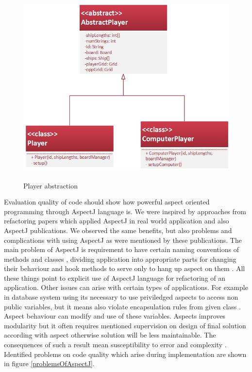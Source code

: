 \documentclass[11pt,english,a4paper,twoside]{article}
\begin{document}
\begin{figure}[H]  %
					\begin{center}
									\includegraphics[height=10cm]{fig/playerAbstraction.png}
									\caption{Player abstraction}
									\label{playerAbstraction}
					\end{center}
\end{figure}

Evaluation quality of code should show how powerful aspect oriented programming through AspectJ language is. We were inspired by approaches from refactoring papers which applied AspectJ in real world application and also AspectJ publications. We observed the same benefits, but also problems and complications with using AspectJ as were mentioned by these publications. The main problem of AspectJ is requirement to have certain naming conventions of methods and classes \cite{laddad_aspectj_2003}, dividing application into appropriate parts for changing their behaviour and hook methods to serve only to hang up aspect on them \cite{kastner_case_2007}. All these things point to explicit use of AspectJ language for refactoring of an application. Other issues can arise with certain types  of applications. For example in database system using its necessary to use priviledged aspects to access non public variables, but it means also violate encapsulation rules from given class \cite{kastner_case_2007}. Aspect behaviour can modify and use of these variables. Aspects improves modularity but it often requires mentioned supervision on design of final solution according with aspect otherwise solution will be less maintainable. The consequences of such a result mean susceptibility to error and complexity \cite{EAOR_yokomori_2011}. Identified problems on code quality which arise during implementation are shown in figure \ref{problemsOfAspectJ}.
\end{document}
